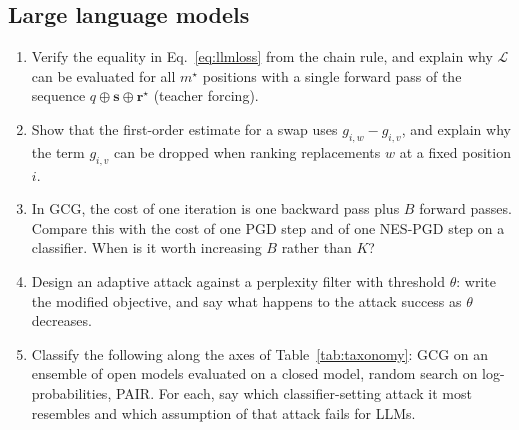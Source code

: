 \documentclass[10pt,a4paper]{extarticle}
\theoremstyle{definition}
\newcommand{\Loss}{\mathcal{L}}
\begin{document}
\subsection*{Large language models}

\begin{enumerate}[label=\textbf{\arabic*.},resume]
  \item Verify the equality in Eq.~\eqref{eq:llmloss} from the chain rule, and explain why \(\Loss\) can be evaluated for all \(m^\star\) positions with a single forward pass of the sequence \(q\oplus\mathbf{s}\oplus\mathbf{r}^\star\) (teacher forcing).
  \item Show that the first-order estimate for a swap uses \(g_{i,w}-g_{i,v}\), and explain why the term \(g_{i,v}\) can be dropped when ranking replacements \(w\) at a fixed position \(i\).
  \item In GCG, the cost of one iteration is one backward pass plus \(B\) forward passes. Compare this with the cost of one PGD step and of one NES-PGD step on a classifier. When is it worth increasing \(B\) rather than \(K\)?
  \item Design an adaptive attack against a perplexity filter with threshold \(\theta\): write the modified objective, and say what happens to the attack success as \(\theta\) decreases.
  \item Classify the following along the axes of Table~\ref{tab:taxonomy}: GCG on an ensemble of open models evaluated on a closed model, random search on log-probabilities, PAIR. For each, say which classifier-setting attack it most resembles and which assumption of that attack fails for LLMs.
\end{enumerate}



\end{document}
